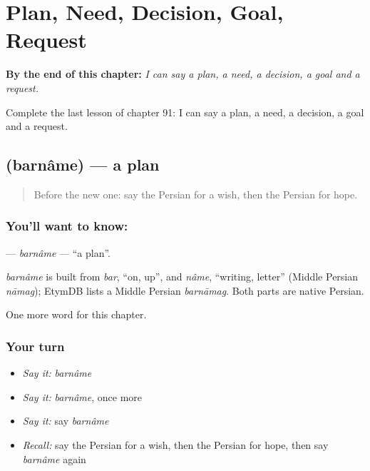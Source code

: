
\chapter{Plan, Need, Decision, Goal, Request}
\label{ch:fa-plan-need-decision-goal-request}

\begin{chapteropening}
\textbf{By the end of this chapter:} \emph{I can say a plan, a need, a decision, a goal and a request.}

Complete the last lesson of chapter 91: I can say a plan, a need, a decision, a goal and a request.
\end{chapteropening}

\section[\texorpdfstring{\fa{برنامه} (barnâme)}{برنامه (barnâme)}]{ (barnâme) — a plan}

\label{lesson:FA-C91-barname}



\begin{quote}
Before the new one: say the Persian for a wish, then the Persian for hope.
\end{quote}

\subsection*{You'll want to know: }
\textbf{} — \emph{barnâme} — \textquotedblleft{}a plan\textquotedblright{}.

\begin{cousinweb}
\emph{barnâme} is built from \emph{bar}, \textquotedblleft{}on, up\textquotedblright{}, and \emph{nâme}, \textquotedblleft{}writing, letter\textquotedblright{} (Middle Persian \emph{nāmag}); EtymDB lists a Middle Persian \emph{barnāmag}. Both parts are native Persian.
\end{cousinweb}

\begin{grammarlens}[title={What you've built}]
One more word for this chapter.
\end{grammarlens}

\subsection*{Your turn}
\begin{itemize}
\raggedright
  \item \emph{Say it:} \emph{barnâme}
  \item \emph{Say it:} \emph{barnâme}, once more
  \item \emph{Say it:} say \emph{barnâme}
  \item \emph{Recall:} say the Persian for a wish, then the Persian for hope, then say \emph{barnâme} again
\end{itemize}

